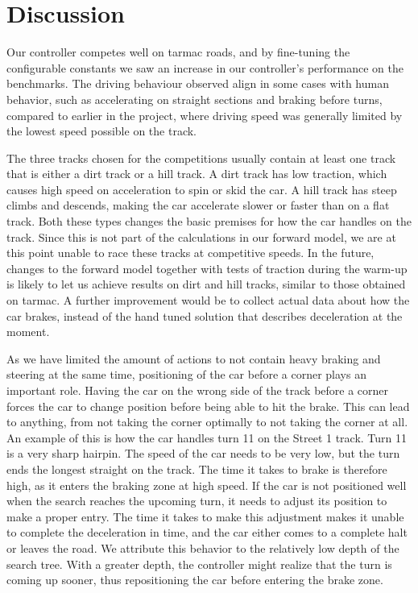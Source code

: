 \documentclass[conference]{IEEEtran}
\begin{document}
\section{Discussion}
\label{sec-discussion}

Our controller competes well on tarmac roads, and by fine-tuning the configurable constants we saw an increase in our controller's performance on the benchmarks. The driving behaviour observed align in some cases with human behavior, such as accelerating on straight sections and braking before turns, compared to earlier in the project, where driving speed was generally limited by the lowest speed possible on the track.

The three tracks chosen for the competitions usually contain at least one track that is either a dirt track or a hill track. A dirt track has low traction, which causes high speed on acceleration to spin or skid the car. A hill track has steep climbs and descends, making the car accelerate slower or faster than on a flat track. Both these types changes the basic premises for how the car handles on the track. Since this is not part of the calculations in our forward model, we are at this point unable to race these tracks at competitive speeds. In the future, changes to the forward model together with tests of traction during the warm-up is likely to let us achieve results on dirt and hill tracks, similar to those obtained on tarmac. A further improvement would be to collect actual data about how the car brakes, instead of the hand tuned solution that describes deceleration at the moment.

As we have limited the amount of actions to not contain heavy braking and steering at the same time, positioning of the car before a corner plays an important role. Having the car on the wrong side of the track before a corner forces the car to change position before being able to hit the brake. This can lead to anything, from not taking the corner optimally to not taking the corner at all. An example of this is how the car handles turn 11 on the Street 1 track. Turn 11 is a very sharp hairpin. The speed of the car needs to be very low, but the turn ends the longest straight on the track. The time it takes to brake is therefore high, as it enters the braking zone at high speed. If the car is not positioned well when the search reaches the upcoming turn, it needs to adjust its position to make a proper entry. The time it takes to make this adjustment makes it unable to complete the deceleration in time, and the car either comes to a complete halt or leaves the road. We attribute this behavior to the relatively low depth of the search tree. With a greater depth, the controller might realize that the turn is coming up sooner, thus repositioning the car before entering the brake zone.
\end{document}
